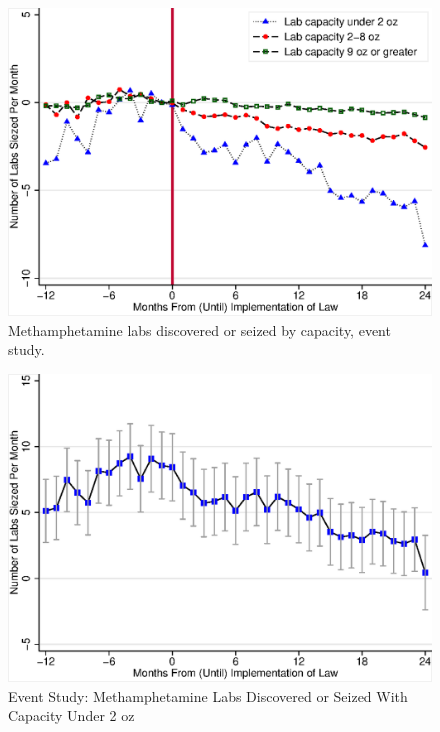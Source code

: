 \documentclass[
  11pt,
]{article}
\begin{document}
\begin{figure}[!hbtp]
 \centering
 \includegraphics{event-study.eps}
 \caption{Methamphetamine labs discovered or seized by capacity, event study.}
\label{event-study}
\end{figure}

\begin{figure}[!hbtp]
 \centering
 \includegraphics{confidence-interval-plot-for-cap_under_2_oz.eps}
 \caption{Event Study: Methamphetamine Labs Discovered or Seized With Capacity Under 2 oz}
\label{ci-cap2}
\end{figure}
\end{document}
